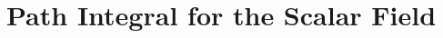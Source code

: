 \documentclass[11pt]{report}
\begin{document}
\setcounter{chapter}{2}

\chapter{Path Integral for the Scalar Field}
\label{chap:lec2}

\end{document}
